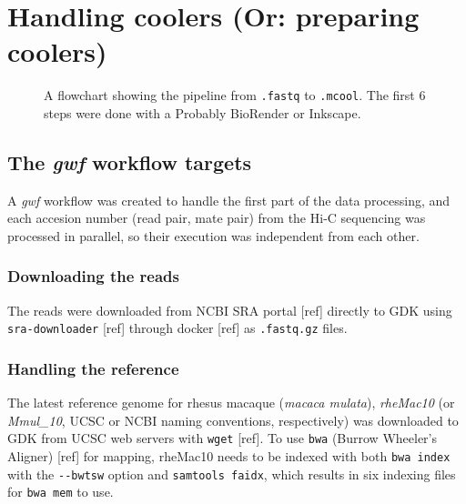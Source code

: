 \documentclass[
  a4paper,
]{scrbook}
\let\oldemph\emph
\renewcommand\emph[1]{\oldemph{\color{gray}#1}}
\begin{document}
\section{Handling coolers (Or: preparing
coolers)}\label{handling-coolers-or-preparing-coolers}

\begin{figure}


\caption{\label{fig-flowchart-handling-coolers}A flowchart showing the
pipeline from \texttt{.fastq} to \texttt{.mcool}. The first 6 steps were
done with a Probably BioRender or Inkscape.}

\end{figure}%

\subsection{\texorpdfstring{The \emph{gwf} workflow
targets}{The gwf workflow targets}}\label{the-gwf-workflow-targets}

A \emph{gwf} workflow was created to handle the first part of the data
processing, and each accesion number (read pair, mate pair) from the
Hi-C sequencing was processed in parallel, so their execution was
independent from each other.

\subsubsection{Downloading the reads}\label{downloading-the-reads}

The reads were downloaded from NCBI SRA portal {[}ref{]} directly to GDK
using \texttt{sra-downloader} {[}ref{]} through docker {[}ref{]} as
\texttt{.fastq.gz} files.

\subsubsection{Handling the reference}\label{handling-the-reference}

The latest reference genome for rhesus macaque (\emph{macaca mulata}),
\emph{rheMac10} (or \emph{Mmul\_10}, UCSC or NCBI naming conventions,
respectively) was downloaded to GDK from UCSC web servers with
\texttt{wget} {[}ref{]}. To use \texttt{bwa} (Burrow Wheeler's Aligner)
{[}ref{]} for mapping, rheMac10 needs to be indexed with both
\texttt{bwa\ index} with the \texttt{-\/-bwtsw} option and
\texttt{samtools\ faidx}, which results in six indexing files for
\texttt{bwa\ mem} to use.
\end{document}
